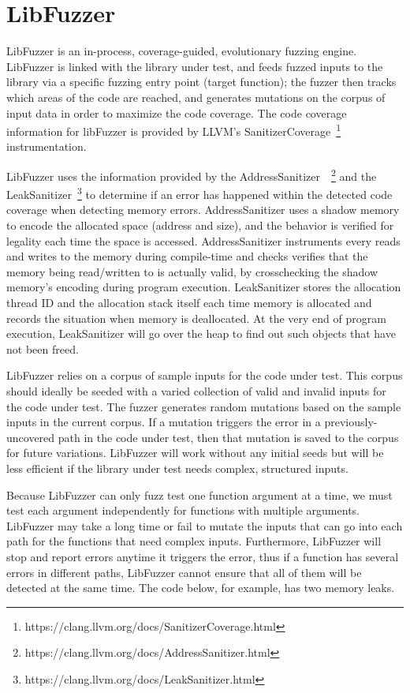 \documentclass[a4paper,11pt,oneside,openany]{book}
\begin{document}
\section{LibFuzzer}
LibFuzzer is an in-process, coverage-guided, evolutionary fuzzing engine. LibFuzzer is linked with the library under test, and feeds fuzzed inputs to the library via a specific fuzzing entry point (target function); the fuzzer then tracks which areas of the code are reached, and generates mutations on the corpus of input data in order to maximize the code coverage. The code coverage information for libFuzzer is provided by LLVM's SanitizerCoverage~\footnote{https://clang.llvm.org/docs/SanitizerCoverage.html} instrumentation.

LibFuzzer uses the information provided by the AddressSanitizer~\cite{asan}~\footnote{https://clang.llvm.org/docs/AddressSanitizer.html} and the LeakSanitizer~\footnote{https://clang.llvm.org/docs/LeakSanitizer.html} to determine if an error has happened within the detected code coverage when detecting memory errors. AddressSanitizer uses a shadow memory to encode the allocated space (address and size), and the behavior is verified for legality each time the space is accessed. AddressSanitizer instruments every reads and writes to the memory during compile-time and checks verifies that the memory being read/written to is actually valid, by crosschecking the shadow memory's encoding during program execution. LeakSanitizer stores the allocation thread ID and the allocation stack itself each time memory is allocated and records the situation when memory is deallocated. At the very end of program execution, LeakSanitizer will go over the heap to find out such objects that have not been freed.

LibFuzzer relies on a corpus of sample inputs for the code under test. This corpus should ideally be seeded with a varied collection of valid and invalid inputs for the code under test. The fuzzer generates random mutations based on the sample inputs in the current corpus. If a mutation triggers the error in a previously-uncovered path in the code under test, then that mutation is saved to the corpus for future variations. LibFuzzer will work without any initial seeds but will be less efficient if the library under test needs complex, structured inputs.

Because LibFuzzer can only fuzz test one function argument at a time, we must test each argument independently for functions with multiple arguments. LibFuzzer may take a long time or fail to mutate the inputs that can go into each path for the functions that need complex inputs. Furthermore, LibFuzzer will stop and report errors anytime it triggers the error, thus if a function has several errors in different paths, LibFuzzer cannot ensure that all of them will be detected at the same time. The code below, for example, has two memory leaks. 
\end{document}
